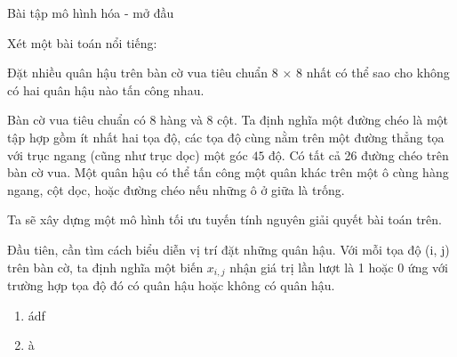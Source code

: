 \begin{exercise}{3}{Bài tập mô hình hóa - mở đầu}

    Xét một bài toán nổi tiếng:

    \begin{problem}{10}
        Đặt nhiều quân hậu trên bàn cờ vua tiêu chuẩn 8 × 8 nhất có thể sao cho
không có hai quân hậu nào tấn công nhau.
    \end{problem}
    \begin{solution}
    Bàn cờ vua tiêu chuẩn có 8 hàng và 8 cột. Ta định nghĩa một đường chéo là một tập hợp gồm ít
    nhất hai tọa độ, các tọa độ cùng nằm trên một đường thẳng tọa với trục ngang (cũng như trục
    dọc) một góc $45$ độ. Có tất cả 26 đường chéo trên bàn cờ vua. Một quân hậu có thể tấn công
    một quân khác trên một ô cùng hàng ngang, cột dọc, hoặc đường chéo nếu những ô ở giữa là trống.

    Ta sẽ xây dựng một mô hình tối ưu tuyến tính nguyên giải quyết bài toán trên.

    Đầu tiên, cần tìm cách biểu diễn vị trí đặt những quân hậu. Với mỗi tọa độ (i, j) trên bàn cờ,
ta định nghĩa một biến $x_{i,j}$ nhận giá trị lần lượt là 1 hoặc 0 ứng với trường hợp tọa độ đó có
quân hậu hoặc không có quân hậu.
    \be
\begin{enumerate}

    \item ádf
    \item à
\end{enumerate}













\end{solution}
\end{exercise}